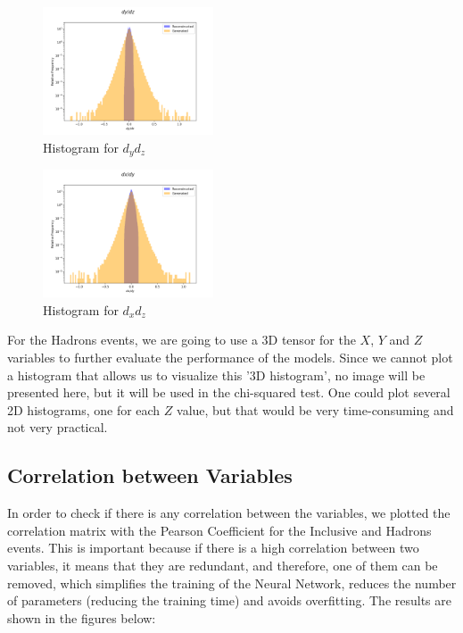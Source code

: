 \documentclass[EPJ,twocolumn]{webofc}
\begin{document}
\begin{figure}[H]
\centering
    \includegraphics[width=0.45\textwidth]{graphs/hadr_dy_dz.png}
    \caption{Histogram for $d_yd_z$}
    \label{fig:had_Angle_m}
\end{figure}
\begin{figure}[H]
\centering
    \includegraphics[width=0.45\textwidth]{graphs/hadr_dx_dy.png}
    \caption{Histogram for $d_xd_z$}
    \label{fig:had_Angle}
\end{figure}





For the Hadrons events, we are going to use a 3D tensor for the $X$, $Y$ and $Z$ variables to further evaluate the performance of the models.
Since we cannot plot a histogram that allows us to visualize this '3D histogram', no image will be presented here, but it will be used in the chi-squared test.
One could plot several 2D histograms, one for each $Z$ value, but that would be very time-consuming and not very practical.


\subsection{Correlation between Variables}
In order to check if there is any correlation between the variables, we plotted the correlation matrix with the Pearson Coefficient for the Inclusive and Hadrons events.
This is important because if there is a high correlation between two variables, it means that they are redundant, and therefore, one of them can be removed, 
which simplifies the training of the Neural Network, reduces the number of parameters (reducing the training time) and avoids overfitting.
The results are shown in the figures below:
\end{document}
